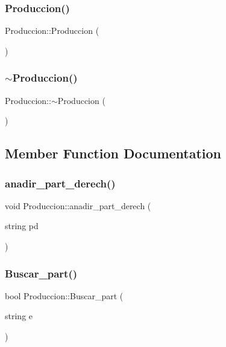 \subsubsection{\texorpdfstring{Produccion()}{Produccion()}}
{\footnotesize\ttfamily Produccion\+::\+Produccion (\begin{DoxyParamCaption}{ }\end{DoxyParamCaption})}

\mbox{\label{class_produccion_a13c3ee25145a810dd61fc636e26f5b7d}} 
\subsubsection{\texorpdfstring{$\sim$\+Produccion()}{~Produccion()}}
{\footnotesize\ttfamily Produccion\+::$\sim$\+Produccion (\begin{DoxyParamCaption}{ }\end{DoxyParamCaption})}



\subsection{Member Function Documentation}
\mbox{\label{class_produccion_a03c832739efee38f117d6b33e3c11c54}} 
\subsubsection{\texorpdfstring{anadir\+\_\+part\+\_\+derech()}{anadir\_part\_derech()}}
{\footnotesize\ttfamily void Produccion\+::anadir\+\_\+part\+\_\+derech (\begin{DoxyParamCaption}\item[{string}]{pd }\end{DoxyParamCaption})}

\mbox{\label{class_produccion_a2192f45a1caead0e79d9a043cf22bc10}} 
\subsubsection{\texorpdfstring{Buscar\+\_\+part()}{Buscar\_part()}}
{\footnotesize\ttfamily bool Produccion\+::\+Buscar\+\_\+part (\begin{DoxyParamCaption}\item[{string}]{e }\end{DoxyParamCaption})}


